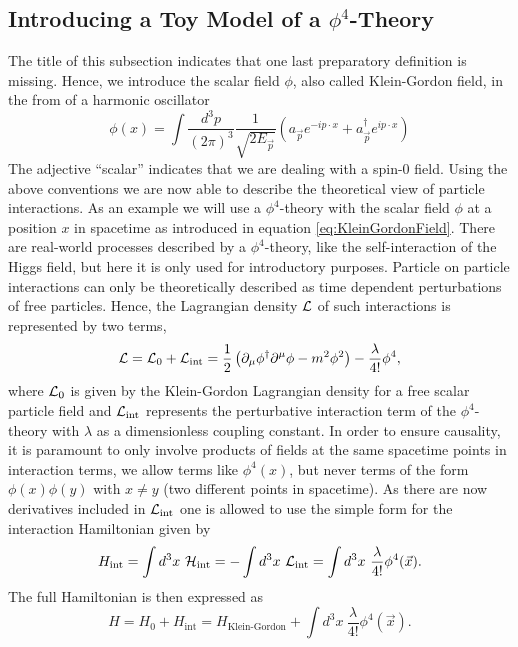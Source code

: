 \subsection{Introducing a Toy Model of a \texorpdfstring{$\phi^4$}{TEXT}-Theory} \label{sec:IntroToyModel}
The title of this subsection indicates that one last preparatory definition is missing. Hence, we introduce the scalar field $\phi$, also called Klein-Gordon field, in the from of a harmonic oscillator
\begin{equation}\label{eq:KleinGordonField}
    \phi (x) = \int \frac{d^3p}{(2\pi)^3} \frac{1}{\sqrt{2E_{\vec{p}}}} \left( a_{\vec{p}} e^{-ip\cdot x} + a_{\vec{p}}^{\dagger}e^{ip\cdot x} \right)
\end{equation}
The adjective ``scalar'' indicates that we are dealing with a spin-$0$ field. Using the above conventions we are now able to describe the theoretical view of particle interactions. As an example we will use a $\phi^4$-theory with the scalar field $\phi$ at a position $x$ in spacetime as introduced in equation \ref{eq:KleinGordonField}. There are real-world processes described by a $\phi^4$-theory, like the self-interaction of the Higgs field, but here it is only used for introductory purposes. Particle on particle interactions can only be theoretically described as time dependent perturbations of free particles. Hence, the Lagrangian density $\mathcal{L}$ of such interactions is represented by two terms,
\begin{equation}\label{eq:Phi4Lagrangian}
 \mathcal{L} = \mathcal{L}_0 + \mathcal{L}_{\text{int}} = \frac{1}{2}\left( \partial_{\mu} \phi^{\dagger} \partial^{\mu} \phi - m^2 \phi^2 \right) - \frac{\lambda}{4!}\phi^4, 
\end{equation}
where $\mathcal{L}_0$ is given by the Klein-Gordon Lagrangian density for a free scalar particle field and $\mathcal{L}_{\text{int}}$ represents the perturbative interaction term of the $\phi^4$-theory with $\lambda$ as a dimensionless coupling constant. In order to ensure causality, it is paramount to only involve products of fields at the same spacetime points in interaction terms, \ie we allow terms like $\phi^{4}(x)$, but never terms of the form $\phi(x)\phi(y)$ with $x \neq y$ (two different points in spacetime). As there are now derivatives included in $\mathcal{L}_{\text{int}}$ one is allowed to use the simple form for the interaction Hamiltonian given by
\begin{equation}\label{eq:InteractionHamiltonian}
 H_{\text{int}} = \int d^3x \ \Hami_{\text{int}} = - \int d^3x \ \Lagr_{\text{int}} = \int d^3x \ \frac{\lambda}{4!}\phi^4(\vec{x}).
\end{equation}
The full Hamiltonian is then expressed as
\begin{equation}
 H = H_0 + H_{\text{int}} = H_{\text{Klein-Gordon}} + \int d^3x \ \frac{\lambda}{4!}\phi^4(\vec{x}).
\end{equation}

